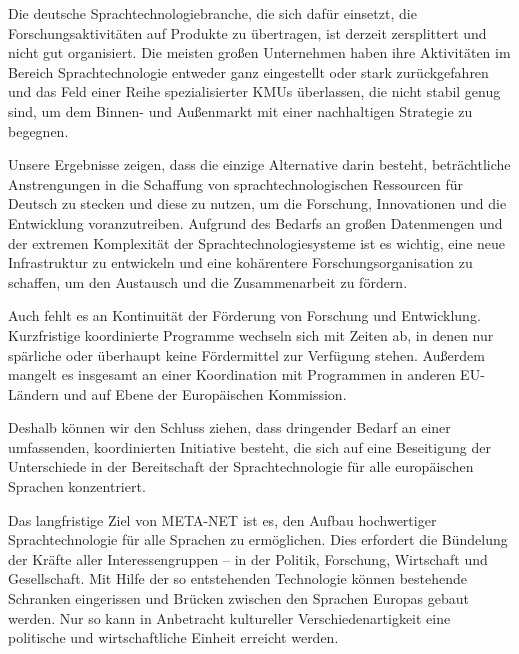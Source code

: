 \documentclass[]{../../metanetpaper}
\begin{document}
\begin{Parallel}[c]{79mm}{78mm}
{Die deutsche Sprachtechnologiebranche, die sich dafür einsetzt, die Forschungsaktivitäten auf Produkte zu übertragen, ist derzeit zersplittert und nicht gut organisiert. Die meisten großen Unternehmen haben ihre Aktivitäten im Bereich Sprachtechnologie entweder ganz eingestellt oder stark zurückgefahren und das Feld einer Reihe spezialisierter KMUs überlassen, die nicht stabil genug sind, um dem Binnen- und Außenmarkt mit einer nachhaltigen Strategie zu begegnen. 

Unsere Ergebnisse zeigen, dass die einzige Alternative darin besteht, beträchtliche Anstrengungen in die Schaffung von sprachtechnologischen Ressourcen für Deutsch zu stecken und diese zu nutzen, um die Forschung, Innovationen und die Entwicklung voranzutreiben. Aufgrund des Bedarfs an großen Datenmengen und der extremen Komplexität der Sprachtechnologiesysteme ist es wichtig, eine neue Infrastruktur zu entwickeln und eine kohärentere Forschungsorganisation zu schaffen, um den Austausch und die Zusammenarbeit zu fördern.

Auch fehlt es an Kontinuität der Förderung von Forschung und Entwicklung. Kurzfristige koordinierte Programme wechseln sich mit Zeiten ab, in denen nur spärliche oder überhaupt keine Fördermittel zur Verfügung stehen. Außerdem mangelt es insgesamt an einer Koordination mit Programmen in anderen EU-Ländern und auf Ebene der Europäischen Kommission.

Deshalb können wir den Schluss ziehen, dass dringender Bedarf an einer umfassenden, koordinierten Initiative besteht, die sich auf eine Beseitigung der Unterschiede in der Bereitschaft der Sprachtechnologie für alle europäischen Sprachen konzentriert.

Das langfristige Ziel von META-NET ist es, den Aufbau hochwertiger Sprachtechnologie für alle Sprachen zu ermöglichen. Dies erfordert die Bündelung der Kräfte aller Interessengruppen – in der Politik, Forschung, Wirtschaft und Gesellschaft. Mit Hilfe der so entstehenden Technologie können bestehende Schranken eingerissen und Brücken zwischen den Sprachen Europas gebaut werden. Nur so kann in Anbetracht kultureller Verschiedenartigkeit eine politische und wirtschaftliche Einheit erreicht werden. 
  }

\end{Parallel}
\end{document}
